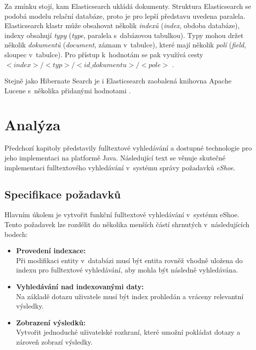 \documentclass[11pt,oneside]{fithesis2}
\begin{document}
Za zmínku stojí, kam Elasticsearch ukládá dokumenty. Struktura Elasticsearch se podobá modelu relační databáze, proto je pro lepší představu uvedena paralela. Elasticsearch klastr může obsahovat několik \emph{indexů} (\emph{index}, obdoba databáze), indexy obsahují \emph{typy} (\emph{type}, paralela s~dabázovou tabulkou). Typy mohou držet několik \emph{dokumentů} (\emph{document}, záznam v~tabulce), které mají několik \emph{polí} (\emph{field}, sloupec v~tabulce). Pro přístup k~hodnotám se pak využívá cesty $<index>/<typ>/<id\_dokumentu>/<pole>$ \cite{ElasticsearchDefinitiveGuide}.

Stejně jako Hibernate Search je i Elasticsearch zaobalená knihovna Apache Lucene s~několika přidanými hodnotami \cite{ElasticsearchDefinitiveGuide}. 

\chapter{Analýza}
\label{Analyza}
Předchozí kapitoly představily fulltextové vyhledávání a dostupné technologie pro jeho implementaci na platformě Java. Následující text se věnuje skutečné implementaci fulltextového vyhledávání v~systému správy požadavků \emph{eShoe}. 


\section{Specifikace požadavků}
\label{SpecifikacePozadavku}
Hlavním úkolem je vytvořit funkční fulltextové vyhledávání v~systému eShoe. Tento požadavek lze rozdělit do několika menších částí shrnutých v~následujících bodech:
\begin{itemize}
	\item \textbf{Provedení indexace:} \\ 
		 Při modifikaci entity v~databázi musí být entita rovněž vhodně uložena do indexu pro fulltextové vyhledávání, aby mohla být následně vyhledávána.

	\item \textbf{Vyhledávání nad indexovanými daty:} \\
		Na základě dotazu uživatele musí být index prohledán a vráceny relevantní výsledky.

	\item \textbf{Zobrazení výsledků:} \\
		Vytvořit jednoduché uživatelské rozhraní, které umožní pokládat dotazy a zároveň zobrazí výsledky.		
\end{itemize}
\end{document}
